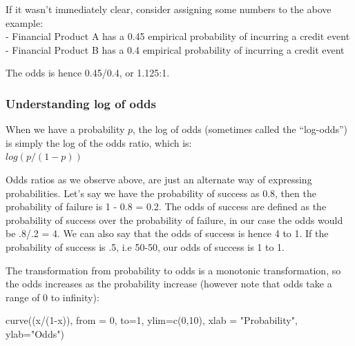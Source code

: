 \documentclass[
]{article}
\newenvironment{Shaded}{\begin{snugshade}}{\end{snugshade}}
\newcommand{\AttributeTok}[1]{\textcolor[rgb]{0.77,0.63,0.00}{#1}}
\newcommand{\DecValTok}[1]{\textcolor[rgb]{0.00,0.00,0.81}{#1}}
\newcommand{\FunctionTok}[1]{\textcolor[rgb]{0.00,0.00,0.00}{#1}}
\newcommand{\NormalTok}[1]{#1}
\newcommand{\SpecialCharTok}[1]{\textcolor[rgb]{0.00,0.00,0.00}{#1}}
\newcommand{\StringTok}[1]{\textcolor[rgb]{0.31,0.60,0.02}{#1}}
\begin{document}
If it wasn't immediately clear, consider assigning some numbers to the
above example:\\
- Financial Product A has a 0.45 empirical probability of incurring a
credit event\\
- Financial Product B has a 0.4 empirical probability of incurring a
credit event

The odds is hence 0.45/0.4, or 1.125:1.

\hypertarget{understanding-log-of-odds}{%
\subsubsection{Understanding log of
odds}\label{understanding-log-of-odds}}

When we have a probability \(p\), the log of odds (sometimes called the
``log-odds'') is simply the log of the odds ratio, which is:\\
\(log(p/(1-p))\)

Odds ratios as we observe above, are just an alternate way of expressing
probabilities. Let's say we have the probability of success as 0.8, then
the probability of failure is 1 - 0.8 = 0.2. The odds of success are
defined as the probability of success over the probability of failure,
in our case the odds would be .8/.2 = 4. We can also say that the odds
of success is hence 4 to 1. If the probability of success is .5, i.e
50-50, our odds of success is 1 to 1.

The transformation from probability to odds is a monotonic
transformation, so the odds increases as the probability increase
(however note that odds take a range of 0 to infinity):

\begin{Shaded}
\begin{Highlighting}[]
\FunctionTok{curve}\NormalTok{((x}\SpecialCharTok{/}\NormalTok{(}\DecValTok{1}\SpecialCharTok{{-}}\NormalTok{x)), }\AttributeTok{from =} \DecValTok{0}\NormalTok{, }\AttributeTok{to=}\DecValTok{1}\NormalTok{, }\AttributeTok{ylim=}\FunctionTok{c}\NormalTok{(}\DecValTok{0}\NormalTok{,}\DecValTok{10}\NormalTok{), }\AttributeTok{xlab =} \StringTok{"Probability"}\NormalTok{, }\AttributeTok{ylab=}\StringTok{"Odds"}\NormalTok{)}
\end{Highlighting}
\end{Shaded}
\end{document}
